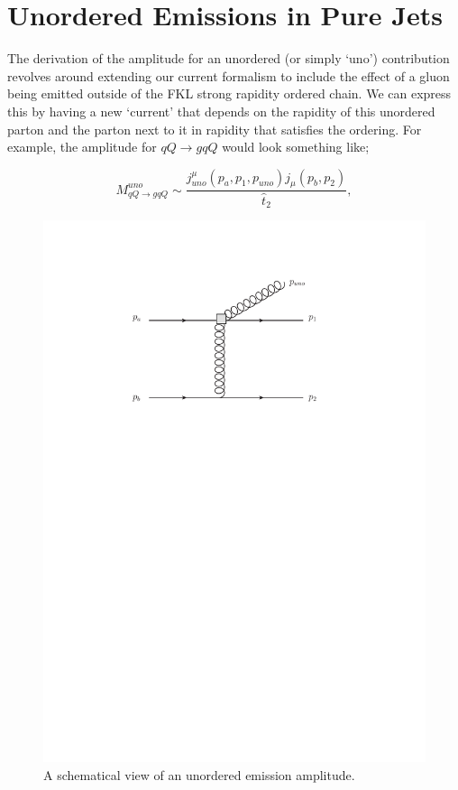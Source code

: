 \section{Unordered Emissions in Pure Jets}
The derivation of the amplitude for an unordered (or simply `uno') contribution revolves around extending our current formalism to include the effect of a gluon being emitted outside of the FKL strong rapidity ordered chain. We can express this by having a new `current' that depends on the rapidity of this unordered parton and the parton next to it in rapidity that satisfies the ordering. For example, the amplitude for $qQ \to gqQ$ would look something like;

\begin{equation}
M_{qQ \to gqQ}^{uno} \sim \frac{j^\mu_{uno}(p_a,p_1,p_{uno})j_\mu(p_b,p_2)}{\hat{t}_2},
\label{eqn:uno}
\end{equation}

\begin{figure}[t]
\centering
\includegraphics[scale=0.7]{Images/uno.pdf}
\caption{A schematical view of an unordered emission amplitude.}
\label{fig:uno}
\end{figure}

